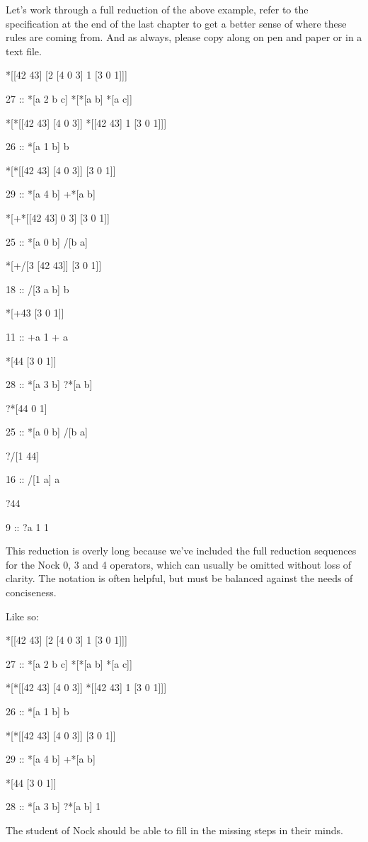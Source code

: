 Let's work through a full reduction of the above example, refer to the specification at the end of the last chapter to get a better sense of where these rules are coming from. And as always, please copy along on pen and paper or in a text file.

\begin{code}
*[[42 43] [2 [4 0 3] 1 [3 0 1]]]

      27 ::    *[a 2 b c]       *[*[a b] *[a c]]


*[*[[42 43] [4 0 3]] *[[42 43] 1 [3 0 1]]]

      26 ::    *[a 1 b]         b


*[*[[42 43] [4 0 3]] [3 0 1]]

      29 ::    *[a 4 b]         +*[a b]

*[+*[[42 43] 0 3] [3 0 1]]

      25 ::    *[a 0 b]         /[b a]

*[+/[3 [42 43]] [3 0 1]]

      18 ::    /[3 a b]         b

*[+43 [3 0 1]]

      11 ::    +a               1 + a

*[44 [3 0 1]]

      28 ::    *[a 3 b]         ?*[a b]

?*[44 0 1]

      25 ::    *[a 0 b]         /[b a]

?/[1 44]

      16 ::    /[1 a]           a

?44

      9  ::    ?a               1
1
\end{code}

This reduction is overly long because we've included the full reduction sequences for the Nock 0, 3 and 4 operators, which can usually be omitted without loss of clarity. The notation is often helpful, but must be balanced against the needs of conciseness. 

Like so:

\begin{code}
*[[42 43] [2 [4 0 3] 1 [3 0 1]]]

    27 ::    *[a 2 b c]       *[*[a b] *[a c]]


*[*[[42 43] [4 0 3]] *[[42 43] 1 [3 0 1]]]

    26 ::    *[a 1 b]         b

*[*[[42 43] [4 0 3]] [3 0 1]]

    29 ::    *[a 4 b]         +*[a b]

*[44 [3 0 1]]

    28 ::    *[a 3 b]         ?*[a b]
1
\end{code}
The student of Nock should be able to fill in the missing steps in their minds.

